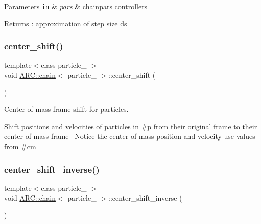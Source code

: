 \begin{DoxyParams}[1]{Parameters}
\mbox{\tt in}  & {\em pars} & chainpars controllers \\
\hline
\end{DoxyParams}
\begin{DoxyReturn}{Returns}
\+: approximation of step size ds 
\end{DoxyReturn}
\hypertarget{classARC_1_1chain_a2abf3aad903a354f29764ad7c8142ab6}{}\label{classARC_1_1chain_a2abf3aad903a354f29764ad7c8142ab6} 
\subsubsection{\texorpdfstring{center\+\_\+shift()}{center\_shift()}}
{\footnotesize\ttfamily template$<$class particle\+\_\+ $>$ \\
void \hyperlink{classARC_1_1chain}{A\+R\+C\+::chain}$<$ particle\+\_\+ $>$\+::center\+\_\+shift (\begin{DoxyParamCaption}{ }\end{DoxyParamCaption})\hspace{0.3cm}{\ttfamily [inline]}}



Center-\/of-\/mass frame shift for particles. 

Shift positions and velocities of particles in \#p from their original frame to their center-\/of-\/mass frame~\newline
Notice the center-\/of-\/mass position and velocity use values from \#cm \hypertarget{classARC_1_1chain_ab56fbddf27416cd640c535ec267cc4bc}{}\label{classARC_1_1chain_ab56fbddf27416cd640c535ec267cc4bc} 
\subsubsection{\texorpdfstring{center\+\_\+shift\+\_\+inverse()}{center\_shift\_inverse()}}
{\footnotesize\ttfamily template$<$class particle\+\_\+ $>$ \\
void \hyperlink{classARC_1_1chain}{A\+R\+C\+::chain}$<$ particle\+\_\+ $>$\+::center\+\_\+shift\+\_\+inverse (\begin{DoxyParamCaption}{ }\end{DoxyParamCaption})\hspace{0.3cm}{\ttfamily [inline]}}




